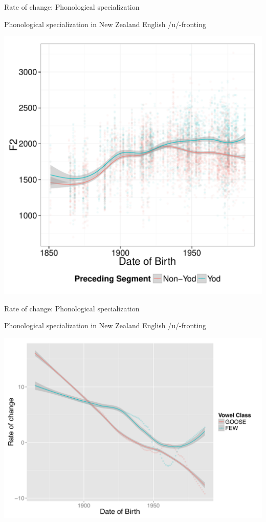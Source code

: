 \documentclass[hyperref={pdfpagelabels=false}]{beamer}
\newcommand{\bonusend}{
   \setcounter{framenumber}{\value{finalframe}}
}
\begin{document}
\begin{frame}{Rate of change: Phonological specialization}
	\begin{block}{\small{Phonological specialization in New Zealand English /u/-fronting}}
	\begin{center}
	\includegraphics[width=.8\textwidth,height=.7\textheight]{ByTokenOldPreceding.pdf}
	\end{center}
	\end{block}	
\end{frame}

\begin{frame}{Rate of change: Phonological specialization}
	\begin{block}{\small{Phonological specialization in New Zealand English /u/-fronting}}
	\begin{center}
	\includegraphics[width=.8\textwidth,height=.7\textheight]{NZEroc.pdf}
	\end{center}
	\end{block}	
\end{frame}

\bonusend
\end{document}
